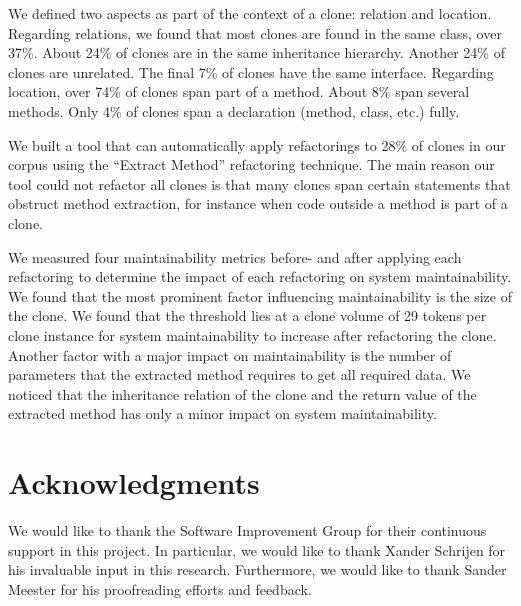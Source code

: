 \documentclass[sigconf,review, table]{acmart}
\begin{document}
We defined two aspects as part of the context of a clone: relation and location. Regarding relations, we found that most clones are found in the same class, over 37\%. About 24\% of clones are in the same inheritance hierarchy. Another 24\% of clones are unrelated. The final 7\% of clones have the same interface. Regarding location, over 74\% of clones span part of a method. About 8\% span several methods. Only 4\% of clones span a declaration (method, class, etc.) fully.

We built a tool that can automatically apply refactorings to 28\% of clones in our corpus using the ``Extract Method'' refactoring technique. The main reason our tool could not refactor all clones is that many clones span certain statements that obstruct method extraction, for instance when code outside a method is part of a clone.

We measured four maintainability metrics before- and after applying each refactoring to determine the impact of each refactoring on system maintainability. We found that the most prominent factor influencing maintainability is the size of the clone. We found that the threshold lies at a clone volume of 29 tokens per clone instance for system maintainability to increase after refactoring the clone. Another factor with a major impact on maintainability is the number of parameters that the extracted method requires to get all required data. We noticed that the inheritance relation of the clone and the return value of the extracted method has only a minor impact on system maintainability.

\section*{Acknowledgments}
We would like to thank the Software Improvement Group for their continuous support in this project. In particular, we would like to thank Xander Schrijen for his invaluable input in this research. Furthermore, we would like to thank Sander Meester for his proofreading efforts and feedback.



\end{document}
